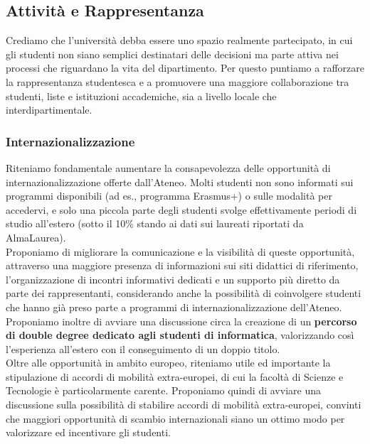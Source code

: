 \documentclass[12pt,a4paper]{article}
\begin{document}
\subsection{Attività e Rappresentanza}
Crediamo che l’università debba essere uno spazio realmente partecipato, in cui gli studenti non siano semplici destinatari delle decisioni ma parte attiva nei processi che riguardano la vita del dipartimento. Per questo puntiamo a rafforzare la rappresentanza studentesca e a promuovere una maggiore collaborazione tra studenti, liste e istituzioni accademiche, sia a livello locale che interdipartimentale.

\subsubsection{Internazionalizzazione}
Riteniamo fondamentale aumentare la consapevolezza delle opportunità di internazionalizzazione offerte dall'Ateneo. Molti studenti non sono informati sui programmi disponibili (ad es., programma Erasmus+) o sulle modalità per accedervi, e solo una piccola parte degli studenti svolge effettivamente periodi di studio all'estero (sotto il 10\% stando ai dati sui laureati riportati da AlmaLaurea).
\\ Proponiamo di migliorare la comunicazione e la visibilità di queste opportunità, attraverso una maggiore presenza di informazioni sui siti didattici di riferimento, l'organizzazione di incontri informativi dedicati e un supporto più diretto da parte dei rappresentanti, considerando anche la possibilità di coinvolgere studenti che hanno già preso parte a programmi di internazionalizzazione dell'Ateneo.
\\ Proponiamo inoltre di avviare una discussione circa la creazione di un \textbf{percorso di double degree dedicato agli studenti di informatica}, valorizzando così l'esperienza all'estero con il conseguimento di un doppio titolo.
\\ Oltre alle opportunità in ambito europeo, riteniamo utile ed importante la stipulazione di accordi di mobilità extra-europei, di cui la facoltà di Scienze e Tecnologie è particolarmente carente. Proponiamo quindi di avviare una discussione sulla possibilità di stabilire accordi di mobilità extra-europei, convinti che maggiori opportunità di scambio internazionali siano un ottimo modo per valorizzare ed incentivare gli studenti.
\end{document}
